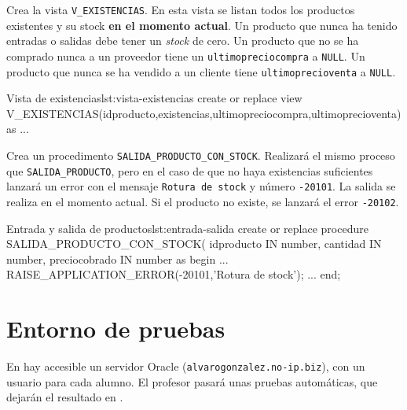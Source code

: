 \begin{homeworkProblem}

  Crea la vista \texttt{V\_EXISTENCIAS}. En esta vista se listan todos los productos existentes y su stock \textbf{en el momento actual}. Un producto que nunca ha tenido entradas o salidas debe tener un \textit{stock} de cero. Un producto que no se ha comprado nunca a un proveedor tiene un \texttt{ultimopreciocompra} a \texttt{NULL}. Un producto que nunca se ha vendido a un cliente tiene \texttt{ultimoprecioventa} a \texttt{NULL}.

  \begin{listadosql}{Vista de existencias}{lst:vista-existencias}
create or replace view V_EXISTENCIAS(idproducto,existencias,ultimopreciocompra,ultimoprecioventa) as
...
  \end{listadosql}  
  
\end{homeworkProblem}



\begin{homeworkProblem}

  Crea un procedimento \texttt{SALIDA\_PRODUCTO\_CON\_STOCK}. Realizará el mismo proceso que \texttt{SALIDA\_PRODUCTO}, pero en el caso de que no haya existencias suficientes lanzará un error con el mensaje \texttt{Rotura de stock} y número \texttt{-20101}. La salida se realiza en el momento actual.
  Si el producto no existe, se lanzará el error \texttt{-20102}.

  \begin{listadosql}{Entrada y salida de productos}{lst:entrada-salida}
create or replace procedure SALIDA_PRODUCTO_CON_STOCK(
  idproducto IN number,
  cantidad IN number,
  preciocobrado IN number
as
begin
  ...
  RAISE_APPLICATION_ERROR(-20101,'Rotura de stock');
  ...
end; 
  \end{listadosql}
  
\end{homeworkProblem}

\section{Entorno de pruebas}
En hay accesible un servidor Oracle (\texttt{alvarogonzalez.no-ip.biz}), con un usuario para cada alumno.
El profesor pasará unas pruebas automáticas, que dejarán el resultado en .

